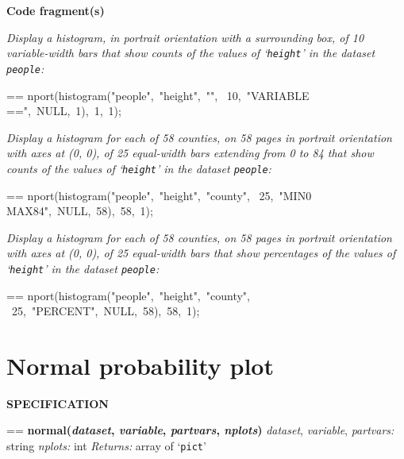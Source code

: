 \documentclass{book}
\makeatletter
\newcommand\Texinfocommandstyletextvar[1]{{\normalfont{}\textsl{#1}}}%
\newenvironment{Texinfopreformatted}{%
  \par\GNUTobeylines\obeyspaces\frenchspacing\parskip=\z@\parindent=\z@}{}
{\catcode`\^^M=13 \gdef\GNUTobeylines{\catcode`\^^M=13 \def^^M{\null\par}}}
\newenvironment{Texinfoindented}{\begin{list}{}{}\item\relax}{\end{list}}
\renewcommand{\_}{\Texinfounderscore\discretionary{}{}{}}
\makeatother
\begin{document}
\noindent{}\textbf{Code fragment(s)}

\emph{Display a histogram, in portrait orientation with a surrounding
box, of 10 variable-width bars that show counts of
the values of `\texttt{height}' in the dataset \texttt{people}:}
\begin{Texinfoindented}
\begin{Texinfopreformatted}%
\ttfamily nport(histogram("people",\ "height",\ "",
\                          10,\ "VARIABLE ==",\ NULL,\ 1),\ 1,\ 1);
\end{Texinfopreformatted}
\end{Texinfoindented}

\emph{Display a histogram for each of 58 counties, on 58 pages in portrait orientation
with axes at (0, 0), of 25 equal-width bars extending from 0 to 84 that show counts of
the values of `\texttt{height}' in the dataset \texttt{people}:}
\begin{Texinfoindented}
\begin{Texinfopreformatted}%
\ttfamily nport(histogram("people",\ "height",\ "county",
\                          25,\ "MIN0 MAX84",\ NULL,\ 58),\ 58,\ 1);
\end{Texinfopreformatted}
\end{Texinfoindented}

\emph{Display a histogram for each of 58 counties, on 58 pages in portrait orientation
with axes at (0, 0), of 25 equal-width bars that show percentages of
the values of `\texttt{height}' in the dataset \texttt{people}:}
\begin{Texinfoindented}
\begin{Texinfopreformatted}%
\ttfamily nport(histogram("people",\ "height",\ "county",
\                          25,\ "PERCENT",\ NULL,\ 58),\ 58,\ 1);
\end{Texinfopreformatted}
\end{Texinfoindented}

\section{{Normal probability plot}}
\label{anchor:Normal-probability-plot}%

\noindent{}\textbf{SPECIFICATION}
\begin{Texinfoindented}
\begin{Texinfopreformatted}%
\textbf{normal(\Texinfocommandstyletextvar{dataset}, \Texinfocommandstyletextvar{variable}, \Texinfocommandstyletextvar{partvars}, \Texinfocommandstyletextvar{nplots})}
\Texinfocommandstyletextvar{dataset}, \Texinfocommandstyletextvar{variable}, \Texinfocommandstyletextvar{partvars:} string
\Texinfocommandstyletextvar{nplots:} int
\Texinfocommandstyletextvar{Returns:} array of `\texttt{pict}'
\end{Texinfopreformatted}
\end{Texinfoindented}
%
%
%
%
%
\end{document}
